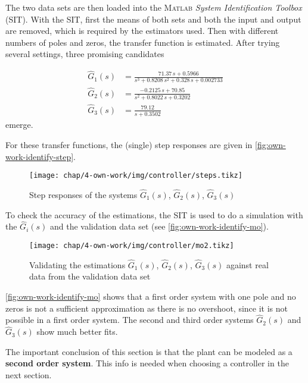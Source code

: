 The two data sets are then loaded into the \textsc{Matlab} \textit{System Identification Toolbox} (SIT). With the SIT, first the means of both sets and both the input and output are removed, which is required by the estimators used. Then with different numbers of poles and zeros, the transfer function is estimated. After trying several settings, three promising candidates

\begin{align}
\hat{G}_1(s) &= \frac{71.37\,s + 0.5966}{s^3 + 0.8208\,s^2 + 0.328\,s + 0.002733} \\[1em]
\hat{G}_2(s) &= \frac{-0.2125\,s + 70.85}{s^2 + 0.8022\,s + 0.3202} \\[1em]
\hat{G}_3(s) &= \frac{79.12}{s + 0.3502}
\end{align}
emerge.

For these transfer functions, the (single) step responses are given in \autoref{fig:own-work-identify-step}.

\begin{figure}[tb]
	\centering
	\texttt{[image: chap/4-own-work/img/controller/steps.tikz]}
	\caption{Step responses of the systems $\hat{G}_1(s)$, $\hat{G}_2(s)$, $\hat{G}_3(s)$}
	\label{fig:own-work-identify-step}
\end{figure}

To check the accuracy of the estimations, the SIT is used to do a simulation with the $\hat{G}_i(s)$ and the validation data set (see \autoref{fig:own-work-identify-mo}).

\begin{figure}[tb]
	\centering
	\texttt{[image: chap/4-own-work/img/controller/mo2.tikz]}
	\caption{Validating the estimations $\hat{G}_1(s)$, $\hat{G}_2(s)$, $\hat{G}_3(s)$ against real data from the validation data set}
	\label{fig:own-work-identify-mo}
\end{figure}

\autoref{fig:own-work-identify-mo} shows that a first order system with one pole and no zeros is not a sufficient approximation as there is no overshoot, since it is not possible in a first order system. The second and third order systems $\hat{G}_2(s)$ and $\hat{G}_3(s)$ show much better fits.

The important conclusion of this section is that the plant can be modeled as a \textbf{second order system}. This info is needed when choosing a controller in the next section.

\FloatBarrier
